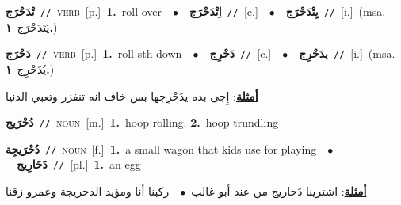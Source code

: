 \documentclass[10pt,a4paper,twoside]{article} %
\begin{document}
\begin{multicols}{2}
{\setlength\topsep{0pt}\textbf{\foreignlanguage{arabic}{تْدَحْرَج}}\ {\color{gray}\texttt{//}\color{black}}\ \textsc{verb}\ [p.]\ \textbf{1.}~roll over\ \ $\bullet$\ \ \setlength\topsep{0pt}\textbf{\foreignlanguage{arabic}{اِتْدَحْرَج}}\ {\color{gray}\texttt{//}\color{black}}\ [c.]\ \ $\bullet$\ \ \setlength\topsep{0pt}\textbf{\foreignlanguage{arabic}{يِتْدَحْرَج}}\ {\color{gray}\texttt{//}\color{black}}\ [i.]\ \color{gray}(msa. \foreignlanguage{arabic}{يَتَدَحْرَج}~\foreignlanguage{arabic}{\textbf{١.}})\color{black}\ } \vspace{2mm}

{\setlength\topsep{0pt}\textbf{\foreignlanguage{arabic}{دَحْرَج}}\ {\color{gray}\texttt{//}\color{black}}\ \textsc{verb}\ [p.]\ \textbf{1.}~roll sth down\ \ $\bullet$\ \ \setlength\topsep{0pt}\textbf{\foreignlanguage{arabic}{دَحْرِج}}\ {\color{gray}\texttt{//}\color{black}}\ [c.]\ \ $\bullet$\ \ \setlength\topsep{0pt}\textbf{\foreignlanguage{arabic}{يدَحْرِج}}\ {\color{gray}\texttt{//}\color{black}}\ [i.]\ \color{gray}(msa. \foreignlanguage{arabic}{يُدَحْرِج}~\foreignlanguage{arabic}{\textbf{١.}})\color{black}\  \begin{flushright}\color{gray}\foreignlanguage{arabic}{\textbf{\underline{\foreignlanguage{arabic}{أمثلة}}}: إِجى بده يدَحْرِجها بس خاف انه تنفزر وتعبي الدنيا}\end{flushright}\color{black}} \vspace{2mm}

{\setlength\topsep{0pt}\textbf{\foreignlanguage{arabic}{دُحْرَيج}}\ {\color{gray}\texttt{//}\color{black}}\ \textsc{noun}\ [m.]\ \textbf{1.}~hoop rolling.  \textbf{2.}~hoop trundling\ } \vspace{2mm}

{\setlength\topsep{0pt}\textbf{\foreignlanguage{arabic}{دُحْرَيجِة}}\ {\color{gray}\texttt{//}\color{black}}\ \textsc{noun}\ [f.]\ \textbf{1.}~a small wagon that kids use for playing\ \ $\bullet$\ \ \setlength\topsep{0pt}\textbf{\foreignlanguage{arabic}{دَحَارِيج}}\ {\color{gray}\texttt{//}\color{black}}\ [pl.]\ \textbf{1.}~an egg\  \begin{flushright}\color{gray}\foreignlanguage{arabic}{\textbf{\underline{\foreignlanguage{arabic}{أمثلة}}}: اشترينا دَحاريج من عند أبو غالب\ $\bullet$\ \  ركبنا أنا ومؤيد الدحريجة وعمرو زقنا}\end{flushright}\color{black}} \vspace{2mm}


\end{multicols}
\end{document}
